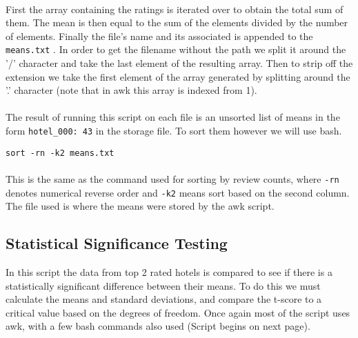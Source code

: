 \documentclass[10pt]{article}
\begin{document}
\paragraph{}
First the array containing the ratings is iterated over to obtain the total sum of them. The mean is then equal to the sum of the elements divided by the number of elements. Finally the file's name and its associated  is appended to the \lstinline$means.txt$ . In order to get the filename without the path we split it around the '/' character and take the last element of the resulting array. Then to strip off the extension we take the first element of the array generated by splitting around the '.' character (note that in awk this array is indexed from 1).
\paragraph{}
The result of running this script on each file is an unsorted list of means in the form \lstinline$hotel_000: 43$ in the storage file. To sort them however we will use bash.
\begin{lstlisting}
sort -rn -k2 means.txt
\end{lstlisting}
\paragraph{}
This is the same as the command used for sorting by review counts, where \lstinline$-rn$ denotes numerical reverse order and \lstinline$-k2$ means sort based on the second column. The file used is where the means were stored by the awk script.

\subsection{Statistical Significance Testing}
In this script the data from top 2 rated hotels is compared to see if there is a statistically significant difference between their means. To do this we must calculate the means and standard deviations, and compare the t-score to a critical value based on the degrees of freedom. Once again most of the script uses awk, with a few bash commands also used (Script begins on next page).
\pagebreak
\end{document}
